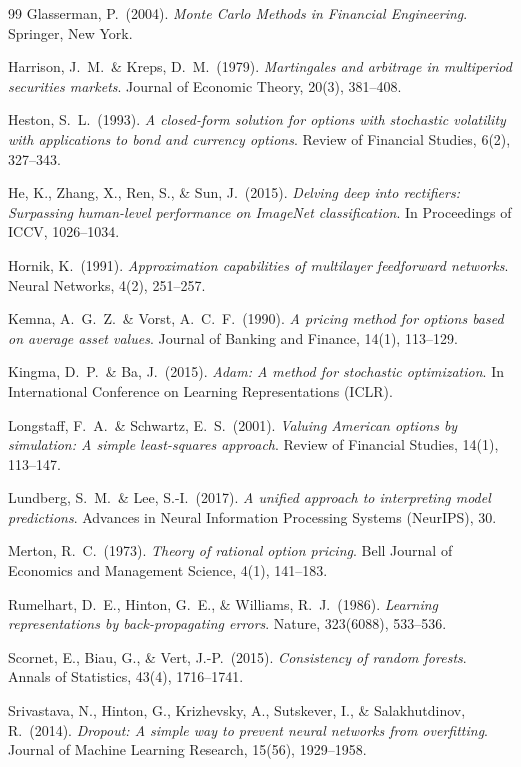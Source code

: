 \documentclass[12pt, a4paper]{report}
\theoremstyle{definition}
\begin{document}
\begin{thebibliography}{99}
Glasserman, P.\ (2004).
\textit{Monte Carlo Methods in Financial Engineering}.
Springer, New York.

Harrison, J.\ M.\ \& Kreps, D.\ M.\ (1979).
\textit{Martingales and arbitrage in multiperiod securities markets}.
Journal of Economic Theory, 20(3), 381--408.

Heston, S.\ L.\ (1993).
\textit{A closed-form solution for options with stochastic volatility
  with applications to bond and currency options}.
Review of Financial Studies, 6(2), 327--343.

He, K., Zhang, X., Ren, S., \& Sun, J.\ (2015).
\textit{Delving deep into rectifiers: Surpassing human-level performance
  on ImageNet classification}.
In Proceedings of ICCV, 1026--1034.

Hornik, K.\ (1991).
\textit{Approximation capabilities of multilayer feedforward networks}.
Neural Networks, 4(2), 251--257.

Kemna, A.\ G.\ Z.\ \& Vorst, A.\ C.\ F.\ (1990).
\textit{A pricing method for options based on average asset values}.
Journal of Banking and Finance, 14(1), 113--129.

Kingma, D.\ P.\ \& Ba, J.\ (2015).
\textit{Adam: A method for stochastic optimization}.
In International Conference on Learning Representations (ICLR).

Longstaff, F.\ A.\ \& Schwartz, E.\ S.\ (2001).
\textit{Valuing American options by simulation: A simple least-squares
  approach}.
Review of Financial Studies, 14(1), 113--147.

Lundberg, S.\ M.\ \& Lee, S.-I.\ (2017).
\textit{A unified approach to interpreting model predictions}.
Advances in Neural Information Processing Systems (NeurIPS), 30.

Merton, R.\ C.\ (1973).
\textit{Theory of rational option pricing}.
Bell Journal of Economics and Management Science, 4(1), 141--183.

Rumelhart, D.\ E., Hinton, G.\ E., \& Williams, R.\ J.\ (1986).
\textit{Learning representations by back-propagating errors}.
Nature, 323(6088), 533--536.

Scornet, E., Biau, G., \& Vert, J.-P.\ (2015).
\textit{Consistency of random forests}.
Annals of Statistics, 43(4), 1716--1741.

Srivastava, N., Hinton, G., Krizhevsky, A., Sutskever, I., \&
Salakhutdinov, R.\ (2014).
\textit{Dropout: A simple way to prevent neural networks from
  overfitting}.
Journal of Machine Learning Research, 15(56), 1929--1958.

\end{thebibliography}
\end{document}
